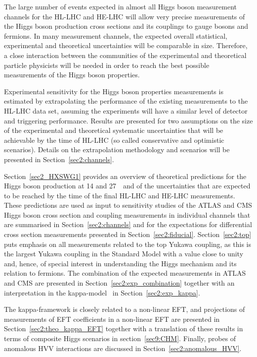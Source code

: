 

The large number of events expected in almost all Higgs boson measurement channels for the HL-LHC and HE-LHC will allow very precise measurements of the Higgs boson production cross sections and its couplings to gauge bosons and fermions. In many measurement channels, the expected overall statistical, experimental and theoretical uncertainties will be comparable in size. Therefore, a close interaction between the communities of the experimental and theoretical particle physicists will be needed in order to reach the best possible measurements of the Higgs boson properties.

Experimental sensitivity for the Higgs boson properties measurements is estimated by extrapolating the performance of the existing measurements to the HL-LHC data set, assuming the experiments will have a similar level of detector and triggering performance. Results are presented for two assumptions on the size of the experimental and theoretical systematic uncertainties that will be achievable by the time of HL-LHC (so called conservative and optimistic scenarios). Details on the extrapolation methodology and scenarios will be presented in Section~\ref{sec2:channels}.

Section~\ref{sec2_HXSWG1} provides an overview of theoretical predictions for the Higgs boson production at 14 and 27~\UTeV\ and of the uncertainties that are expected to be reached by the time of the final HL-LHC and HE-LHC measurements. 
These predictions are used as input to sensitivity studies of the ATLAS and CMS Higgs boson cross section and coupling measurements in individual channels that are summarised in Section~\ref{sec2:channels} and for the expectations for differential cross section measurements presented in Section~\ref{sec2:fiducial}.
Section~\ref{sec2:top} puts emphasis on all measurements related to the top Yukawa coupling, as this is the largest Yukawa coupling in the Standard Model with a value close to unity and, hence, of special interest in understanding the Higgs mechanism and its relation to fermions.
The combination of the expected measurements in ATLAS and CMS are presented in Section~\ref{sec2:exp_combination} together with an interpretation in the kappa-model~\cite{LHCHiggsCrossSectionWorkingGroup:2012nn,Heinemeyer:2013tqa} in Section~\ref{sec2:exp_kappa}.

The kappa-framework is closely related to a non-linear EFT, and projections of measurements of EFT coefficients in a non-linear EFT are presented in Section~\ref{sec2:theo_kappa_EFT} together with a translation of these results in terms of composite Higgs scenarios in section~\ref{sec9:CHM}.
Finally, probes of anomalous HVV interactions are discussed in Section~\ref{sec2:anomalous_HVV}.
